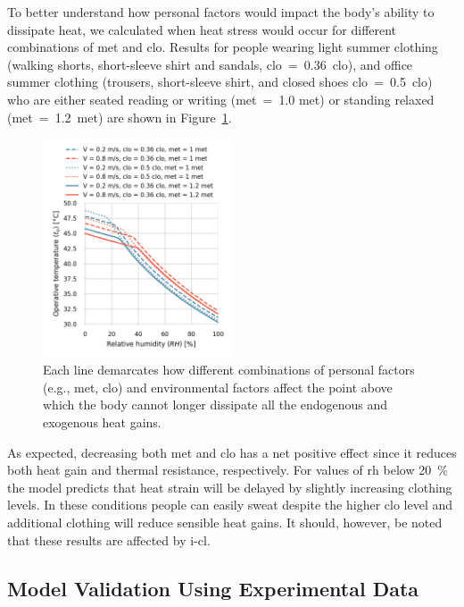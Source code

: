To better understand how personal factors would impact the body's ability to dissipate heat, we calculated when heat stress would occur for different combinations of \ac{met} and \ac{clo}.
Results for people wearing light summer clothing (walking shorts, short-sleeve shirt and sandals, \acs{clo}~=~0.36~clo), and office summer clothing (trousers, short-sleeve shirt, and closed shoes \acs{clo}~=~0.5~clo) who are either seated reading or writing (\ac{met}~=~1.0 met) or standing relaxed (\ac{met}~=~1.2~met) are shown in Figure~\ref{fig:met_clo}.

\begin{figure}[hbt!]
    \centering
    \includegraphics[width=0.5\textwidth]{figures/met_clo}
    \caption{Each line demarcates how different combinations of personal factors (e.g., \ac{met}, \ac{clo}) and environmental factors affect the point above which the body cannot longer dissipate all the endogenous and exogenous heat gains.}
    \label{fig:met_clo}
\end{figure}

As expected, decreasing both \ac{met} and \ac{clo} has a net positive effect since it reduces both heat gain and thermal resistance, respectively.
For values of \ac{rh} below 20~\% the model predicts that heat strain will be delayed by slightly increasing clothing levels.
In these conditions people can easily sweat despite the higher clo level and additional clothing will reduce sensible heat gains.
It should, however, be noted that these results are affected by \ac{i-cl}.


\subsection{Model Validation Using Experimental Data}\label{subsec:model-validation-experimental-data}

